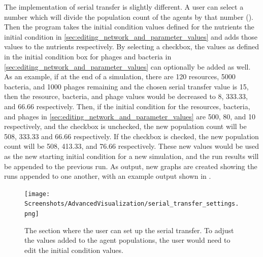 The implementation of serial transfer is slightly different. 
A user can select a number which will divide the population count of the agents by that number (). 
Then the program takes the initial condition values defined for the nutrients the initial condition in \ref{sec:editing_network_and_parameter_values} and adds those values to the nutrients respectively. 
By selecting a checkbox, the values as defined in the initial condition box for phages and bacteria in \ref{sec:editing_network_and_parameter_values} can optionally be added as well. 
As an example, if at the end of a simulation, there are 120 resources, 5000 bacteria, and 1000 phages remaining and the chosen serial transfer value is 15, then the resource, bacteria, and phage values would be decreased to 8, 333.33, and 66.66 respectively. 
Then, if the initial condition for the resources, bacteria, and phages in \ref{sec:editing_network_and_parameter_values} are 500, 80, and 10 respectively, and the checkbox is unchecked, the new population count will be 508, 333.33 and 66.66 respectively. 
If the checkbox is checked, the new population count will be 508, 413.33, and 76.66 respectively. 
These new values would be used as the new starting initial condition for a new simulation, and the run results will be appended to the previous run. 
As output, new graphs are created showing the runs appended to one another, with an example output shown in . 
\begin{figure}
    \centering
    \texttt{[image: Screenshots/AdvancedVisualization/serial\_transfer\_settings.png]}
    \caption{
        The section where the user can set up the serial transfer. 
        To adjust the values added to the agent populations, the user would need to edit the initial condition values. 
    }
    \label{fig:ss:av:serial_transfer_settings}
\end{figure}
